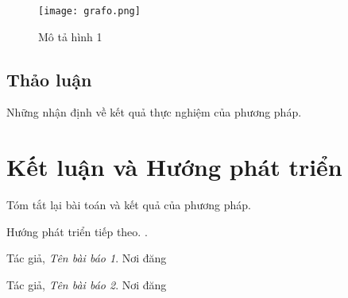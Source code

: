 \documentclass{FR16}
\begin{document}
\newpage

\begin{figure}[h]
    \centering
    \texttt{[image: grafo.png]}
    \caption{Mô tả hình 1}
    \label{fig:hinh1}
\end{figure}

\subsection{Thảo luận}
Những nhận định về kết quả thực nghiệm của phương pháp.

\newpage

\section{Kết luận và Hướng phát triển}
Tóm tắt lại bài toán và kết quả của phương pháp.

Hướng phát triển tiếp theo.
 \cite{baibao2}.
 
\newpage
\begin{thebibliography}{9}
Tác giả, \emph{Tên bài báo 1}. Nơi đăng

Tác giả, \emph{Tên bài báo 2}. Nơi đăng



\end{thebibliography}
\end{document}
